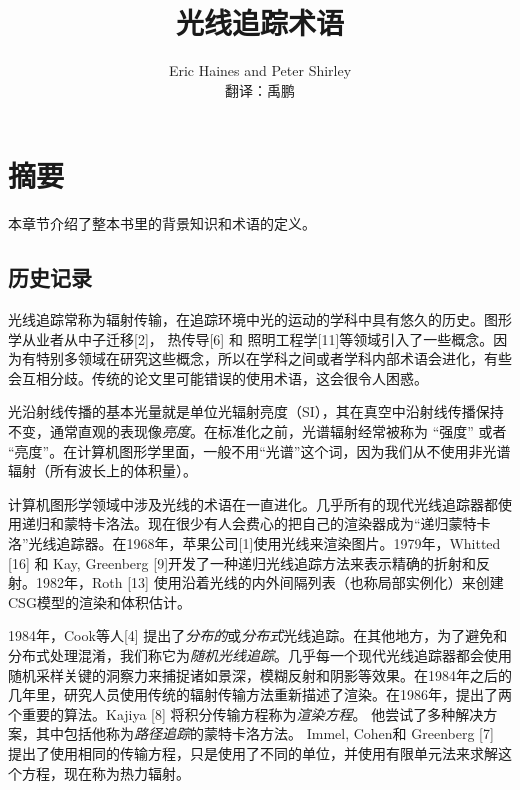 \documentclass[12pt]{article}
\begin{document}
 
 
 
\title{光线追踪术语}%
\author{Eric Haines and Peter Shirley \\
	翻译：禹鹏} 
 
\maketitle
 \tableofcontents
 
 \section{摘要}
 本章节介绍了整本书里的背景知识和术语的定义。
 \subsection{历史记录}
 光线追踪常称为辐射传输，在追踪环境中光的运动的学科中具有悠久的历史。图形学从业者从中子迁移[2]， 热传导[6] 和 照明工程学[11]等领域引入了一些概念。因为有特别多领域在研究这些概念，所以在学科之间或者学科内部术语会进化，有些会互相分歧。传统的论文里可能错误的使用术语，这会很令人困惑。
 
 光沿射线传播的基本光量就是单位光辐射亮度（SI），其在真空中沿射线传播保持不变，通常直观的表现像\textit{亮度}。在标准化之前，光谱辐射经常被称为 “强度” 或者 “亮度”。在计算机图形学里面，一般不用“光谱”这个词，因为我们从不使用非光谱辐射（所有波长上的体积量）。
 
 计算机图形学领域中涉及光线的术语在一直进化。几乎所有的现代光线追踪器都使用递归和蒙特卡洛法。现在很少有人会费心的把自己的渲染器成为“递归蒙特卡洛”光线追踪器。在1968年，苹果公司[1]使用光线来渲染图片。1979年，Whitted [16] 和 Kay, Greenberg [9]开发了一种递归光线追踪方法来表示精确的折射和反射。1982年，Roth [13] 使用沿着光线的内外间隔列表（也称局部实例化）来创建CSG模型的渲染和体积估计。
 
 1984年，Cook等人[4] 提出了\textit{分布的}或\textit{分布式}光线追踪。在其他地方，为了避免和分布式处理混淆，我们称它为\textit{随机光线追踪}。几乎每一个现代光线追踪器都会使用随机采样关键的洞察力来捕捉诸如景深，模糊反射和阴影等效果。在1984年之后的几年里，研究人员使用传统的辐射传输方法重新描述了渲染。在1986年，提出了两个重要的算法。Kajiya [8] 将积分传输方程称为\textit{渲染方程}。 他尝试了多种解决方案，其中包括他称为\textit{路径追踪}的蒙特卡洛方法。 Immel, Cohen和 Greenberg [7] 提出了使用相同的传输方程，只是使用了不同的单位，并使用有限单元法来求解这个方程，现在称为热力辐射。
 
\end{document}

